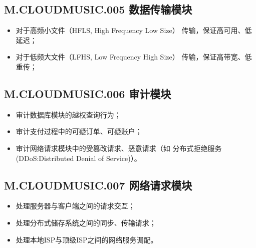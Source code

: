 \subsection{M.CLOUDMUSIC.005 数据传输模块}
\begin{itemize}
    \item 对于高频小文件（HFLS, High Frequency Low Size）
        传输，保证高可用、低延迟；
    \item 对于低频大文件（LFHS, Low Frequency High Size）
        传输，保证高带宽、低重传；
\end{itemize}

\subsection{M.CLOUDMUSIC.006 审计模块}
\begin{itemize}
    \item 审计数据库模块的越权查询行为；
    \item 审计支付过程中的可疑订单、可疑账户；
    \item 审计网络请求模块中的受篡改请求、恶意请求（如
        分布式拒绝服务(DDoS:Distributed Denial of Service)）。
\end{itemize}

\subsection{M.CLOUDMUSIC.007 网络请求模块}
\begin{itemize}
    \item 处理服务器与客户端之间的请求交互；
    \item 处理分布式储存系统之间的同步、传输请求；
    \item 处理本地ISP与顶级ISP之间的网络服务调配。
\end{itemize}

\newpage

